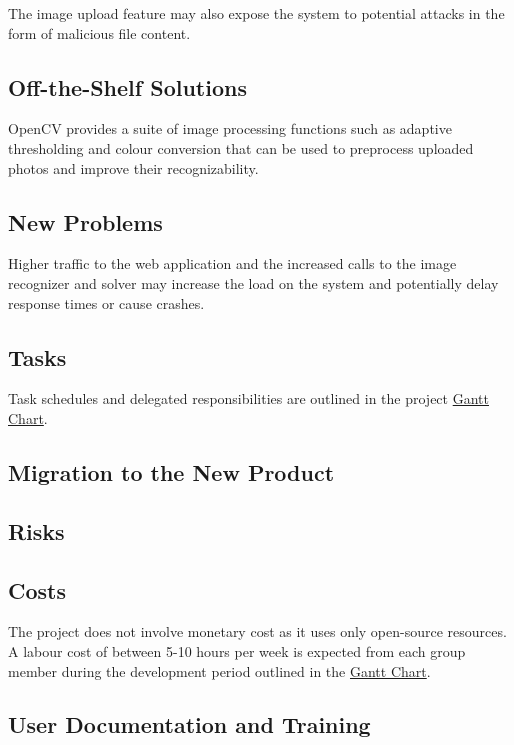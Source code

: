 \documentclass[11pt]{article}
\begin{document}
The image upload feature may also expose the system to potential attacks in the form of malicious file content.

\subsection{Off-the-Shelf Solutions}
OpenCV provides a suite of image processing functions such as adaptive thresholding and colour conversion that can be used to preprocess uploaded photos and improve their recognizability. 

\subsection{New Problems}
Higher traffic to the web application and the increased calls to the image recognizer and solver may increase the load on the system and potentially delay response times or cause crashes.

\subsection{Tasks}
Task schedules and delegated responsibilities are outlined in the project \href{https://gitlab.cas.mcmaster.ca/bhuiyr2/sudokusolver_l02_grp08/-/blob/main/ProjectSchedule/Gantt_Sudoku.pdf}{Gantt Chart}.

\subsection{Migration to the New Product}

\subsection{Risks}

\subsection{Costs}
The project does not involve monetary cost as it uses only open-source resources. A labour cost of between 5-10 hours per week is expected from each group member during the development period outlined in the \href{https://gitlab.cas.mcmaster.ca/bhuiyr2/sudokusolver_l02_grp08/-/blob/main/ProjectSchedule/Gantt_Sudoku.pdf}{Gantt Chart}.

\subsection{User Documentation and Training}
\end{document}
